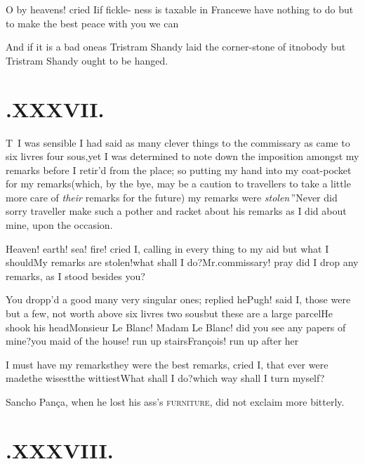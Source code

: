 \documentclass{article}
\begin{document}
\tsh O by heavens! cried I\tsk if
fickle-\break
ness is taxable in France\tsk we have nothing to do
but to make the best peace with you we can\tsh\\[4pt]

\tsh And if it is a bad one\tsk as Tris\-tram
Shandy laid the corner-stone of it\tsk nobody but Tristram
Shandy ought to be hanged.

\section{.\enspace XXXVII.}

\lettrine{T}{\,} I was sensible I had said as
many clever things to the commissary as came to six livres four
sous,\break yet I was determined to note down the imposition amongst my
remarks before I retir’d from the place; so putting my hand into my
coat-pocket for my remarks\tsk (which, by the bye, may be a
caution to travellers to take a little more care of \textit{their}
remarks for the future) \lqq my\break
\lqq remarks were \textit{stolen}\,”\tsh Never did\break
sorry traveller make
such a pother and racket about his remarks as I did about mine,
upon the occasion.

Heaven! earth! sea! fire! cried I, calling in every thing to my
aid but what I should\tsh My remarks are
stolen!\tsk what shall I do?\tsh Mr.\@ commissary! pray
did I drop any remarks, as I stood besides you?\tsh

You dropp’d a good many very singular ones; replied
he\tsh Pugh! said I, those were but a few, not worth above
six livres two sous\tsk but these are a large
parcel\tsh He shook his head\tsh Monsieur Le
Blanc! Madam Le Blanc! did you see any papers of
mine?\tsk you maid of the house! run up
stairs\tsk François! run up after
her\tsh

\tsh I must have my remarks\tsh they were the best
remarks, cried I, that ever were made\tsk the wisest\tsk the
wittiest\tsk What shall I do?\tsk which way shall I turn
myself?

Sancho Pança, when he lost his ass’s
\textsc{furniture}, did not exclaim more bitterly.

\section{.\enspace XXXVIII.}
\end{document}
